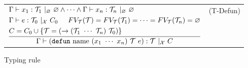 \documentclass{article}
\begin{document}
\begin{figure}[tb]
\begin{tabular}{rlrl}
        \multicolumn{3}{r}{
        $\dfrac{
            \begin{aligned}
                &\Gamma \vdash x_1 : \mathcal{T}_1\ |_\varnothing\ \varnothing \land \cdots \land \Gamma \vdash x_n : \mathcal{T}_n\ |_\varnothing\ \varnothing \\
                &\Gamma \vdash e : \mathcal{T}_0\ |_{\mathcal{X}}\ C_0 \hspace{5mm} FV_\mathcal{T}(\mathcal{T}) = FV_\mathcal{T}(\mathcal{T}_1) = \cdots = FV_\mathcal{T}(\mathcal{T}_n) = \varnothing \\
                &C = C_0 \cup \{\mathcal{T} = (\rightarrow (\mathcal{T}_1\ \cdots\ \mathcal{T}_n)\ \mathcal{T}_0) \}
            \end{aligned}
        }{
            \Gamma \vdash (\mathtt{defun}\ \mathrm{name}\ (x_1\ \cdots\ x_n)\ \mathcal{T}\ e) : \mathcal{T}\ |_\mathcal{X}\ C
        }$
        } & (T-Defun)
    \end{tabular}
    \caption{Typing rule}
\end{figure}
\end{document}
